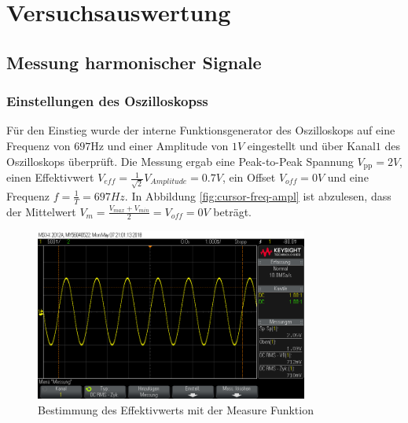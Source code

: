 \documentclass[a4paper]{article}
\begin{document}


\section{Versuchsauswertung}
\subsection{Messung harmonischer Signale}\label{sec:harmonische-signale}
\subsubsection{Einstellungen des Oszilloskopss}
Für den Einstieg wurde der interne Funktionsgenerator des Oszilloskops auf eine Frequenz von $697\si{\Hz}$ und einer Amplitude von $1\si{V}$ eingestellt und über Kanal$1$ des Oszilloskops überprüft.
Die Messung ergab eine Peak-to-Peak Spannung $V_{\text{pp}}=2\si{V}$, einen Effektivwert $V_{\textit{eff}}=\frac{1}{\sqrt{2}}V_{Amplitude}=0.7\si{V}$, ein Offset $V_{\textit{off}}=0\si{V}$ und eine Frequenz $f=\frac{1}{T}=697\si{Hz}$. In Abbildung \ref{fig:cursor-freq-ampl} ist abzulesen, dass der Mittelwert $V_m = \frac{V_{max}+V_{min}}{2}=V_{\textit{off}}=0\si{V}$ beträgt.

\begin{figure}[H]
    \centering
    \includegraphics[width=0.8\textwidth]{aufgabe1_rms_meas.png}
    \caption{Bestimmung des Effektivwerts mit der Measure Funktion}
    \label{fig:rms-meas}
\end{figure}
\end{document}

